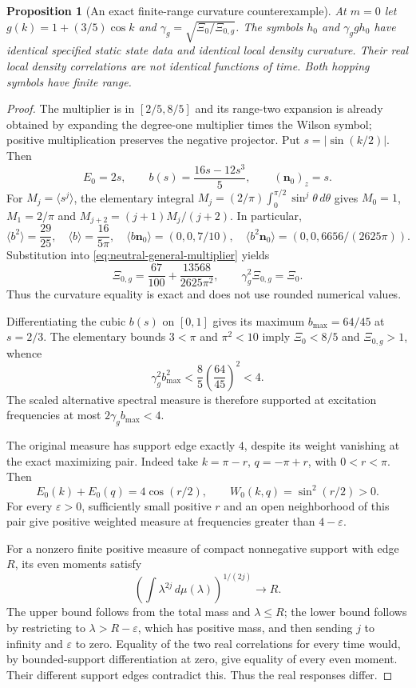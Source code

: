 \documentclass[11pt]{article}
\newtheorem{proposition}[theorem]{Proposition}
\theoremstyle{definition}
\begin{document}
\begin{proposition}[An exact finite-range curvature counterexample]
\label{prop:neutral-shape-counterexample}
At $m=0$ let $g(k)=1+(3/5)\cos k$ and
$\gamma_g=\sqrt{\Xi_0/\Xi_{0,g}}$. The symbols $h_0$ and
$\gamma_g g h_0$ have identical specified static state data and identical
local density curvature. Their real local density correlations are not
identical functions of time. Both hopping symbols have finite range.
\end{proposition}
\begin{proof}
The multiplier is in $[2/5,8/5]$ and its range-two expansion is already
obtained by expanding the degree-one multiplier times the Wilson symbol; positive multiplication
preserves the negative projector. Put $s=|\sin(k/2)|$. Then
\[
 E_0=2s,\qquad b(s)=\frac{16s-12s^3}{5},\qquad
 (\boldsymbol n_0)_z=s.
\]
For $M_j=\langle s^j\rangle$, the elementary integral
$M_j=(2/\pi)\int_0^{\pi/2}\sin^j\theta\,d\theta$ gives
$M_0=1$, $M_1=2/\pi$ and
$M_{j+2}=(j+1)M_j/(j+2)$. In particular,
\[
 \langle b^2\rangle=\frac{29}{25},\quad
 \langle b\rangle=\frac{16}{5\pi},\quad
 \langle b\boldsymbol n_0\rangle=(0,0,7/10),\quad
 \langle b^2\boldsymbol n_0\rangle=(0,0,6656/(2625\pi)).
\]
Substitution into \eqref{eq:neutral-general-multiplier} yields
\begin{equation}
 \Xi_{0,g}=\frac{67}{100}+\frac{13568}{2625\pi^2},
 \qquad \gamma_g^2\Xi_{0,g}=\Xi_0.
 \label{eq:neutral-matched-curvature}
\end{equation}
Thus the curvature equality is exact and does not use rounded numerical
values.

Differentiating the cubic $b(s)$ on $[0,1]$ gives its maximum
$b_{\max}=64/45$ at $s=2/3$. The elementary bounds $3<\pi$ and
$\pi^2<10$ imply $\Xi_0<8/5$ and $\Xi_{0,g}>1$, whence
\[
 \gamma_g^2 b_{\max}^2
 <\frac85\left(\frac{64}{45}\right)^2<4.
\]
The scaled alternative spectral measure is therefore supported at excitation
frequencies at most $2\gamma_g b_{\max}<4$.

The original measure has support edge exactly $4$, despite its weight
vanishing at the exact maximizing pair. Indeed take
$k=\pi-r$, $q=-\pi+r$, with $0<r<\pi$. Then
\[
 E_0(k)+E_0(q)=4\cos(r/2),\qquad W_0(k,q)=\sin^2(r/2)>0.
\]
For every $\varepsilon>0$, sufficiently small positive $r$ and an open
neighborhood of this pair give positive weighted measure at frequencies
greater than $4-\varepsilon$.

For a nonzero finite positive measure of compact nonnegative support with
edge $R$, its even moments satisfy
\[
 \left(\int\lambda^{2j}\,d\mu(\lambda)\right)^{1/(2j)}\longrightarrow R.
\]
The upper bound follows from the total mass and $\lambda\le R$; the lower
bound follows by restricting to $\lambda>R-\varepsilon$, which has positive
mass, and then sending $j$ to infinity and $\varepsilon$ to zero. Equality
of the two real correlations for every time would, by bounded-support
differentiation at zero, give equality of every even moment. Their different
support edges contradict this. Thus the real responses differ.
\end{proof}
\end{document}
